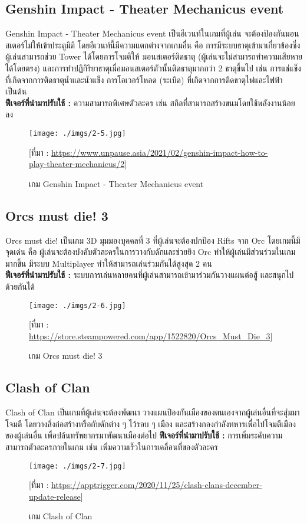\documentclass[12pt,oneside,openright,a4paper]{cpe-thai-project}
\begin{document}
\subsection{Genshin Impact - Theater Mechanicus event}
Genshin Impact - Theater Mechanicus event เป็นอีเวนท์ในเกมที่ผู้เล่น
จะต้องป้องกันมอนสเตอร์ไม่ให้เข้าประตูมิติ โดยอีเวนท์นี้มีความแตกต่างจากเกมอื่น 
คือ การมีระบบธาตุเข้ามาเกี่ยวข้องซึ่งผู้เล่นสามารถช่วย Tower ได้โดยการโจมตีให้
มอนสเตอร์ติดธาตุ (ผู้เล่นจะไม่สามารถทำความเสียหายได้โดยตรง) 
และการทำปฏิกิริยาธาตุเมื่อมอนสเตอร์ตัวนั้นติดธาตุมากกว่า 2 ธาตุขึ้นไป เช่น 
การแช่แข็งที่เกิดจากการติดธาตุน้ำและน้ำแข็ง การโอเวอร์โหลด (ระเบิด) ที่เกิดจากการติดธาตุไฟและไฟฟ้า เป็นต้น\\
\textbf{ฟีเจอร์ที่นำมาปรับใช้ : } ความสามารถพิเศษตัวละคร เช่น สกิลที่สามารถสร้างขนมโดยใช้พลังงานน้อยลง
\begin{figure}[H]\centering
  \texttt{[image: ./imgs/2-5.jpg]}
  \caption{เกม Genshin Impact - Theater Mechanicus event}\label{fig:2-5}
  \small [ที่มา : \url{https://www.unpause.asia/2021/02/genshin-impact-how-to-play-theater-mechanicus/2}]
\end{figure}

\pagebreak
\subsection{Orcs must die! 3}
Orcs must die! เป็นเกม 3D มุมมองบุคคลที่ 3 ที่ผู้เล่นจะต้องปกป้อง Rifts จาก Orc โดยเกมนี้มีจุดเด่น คือ 
ผู้เล่นจะต้องบังคับตัวละครในการวางกับดักและช่วยยิง Orc ทำให้ผู้เล่นมีส่วนร่วมในเกมมากขึ้น มีระบบ Multiplayer 
ทำให้สามารถเล่นร่วมกันได้สูงสุด 2 คน\\
\textbf{ฟีเจอร์ที่นำมาปรับใช้ : } ระบบการเล่นหลายคนที่ผู้เล่นสามารถเข้ามาร่วมกันวางแผนต่อสู้ และสนุกไปด้วยกันได้
\begin{figure}[H]\centering
  \texttt{[image: ./imgs/2-6.jpg]}
  \caption{เกม Orcs must die! 3}\label{fig:2-6}
  \small [ที่มา : \url{https://store.steampowered.com/app/1522820/Orcs_Must_Die_3}]
\end{figure}

\subsection{Clash of Clan}
Clash of Clan เป็นเกมที่ผู้เล่นจะต้องพัฒนา วางแผนป้องกันเมืองของตนเองจากผู้เล่นอื่นที่จะสุ่มมาโจมตี 
โดยวางสิ่งก่อสร้างหรือกับดักต่าง ๆ ไว้รอบ ๆ เมือง และสร้างกองกำลังทหารเพื่อไปโจมตีเมืองของผู้เล่นอื่น
เพื่อปล้นทรัพยากรมาพัฒนาเมืองต่อไป
\textbf{ฟีเจอร์ที่นำมาปรับใช้ : } การเพิ่มระดับความสามารถตัวละครภายในเกม เช่น 
เพิ่มความเร็วในการเคลื่อนที่ของตัวละคร
\begin{figure}[H]\centering
  \texttt{[image: ./imgs/2-7.jpg]}
  \caption{เกม Clash of Clan}\label{fig:2-7}
  \small [ที่มา : \url{https://apptrigger.com/2020/11/25/clash-clans-december-update-release}]
\end{figure}
\end{document}
